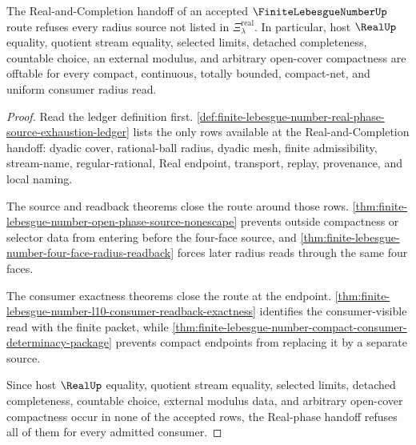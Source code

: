 \begin{theorem}
\label{thm:finite-lebesgue-number-real-phase-offtable-refusal}
The Real-and-Completion handoff of an accepted $\FiniteLebesgueNumberUp$ route refuses every radius source not listed in $\Xi_{\lambda}^{\mathrm{real}}$. In particular, host $\RealUp$ equality, quotient stream equality, selected limits, detached completeness, countable choice, an external modulus, and arbitrary open-cover compactness are offtable for every compact, continuous, totally bounded, compact-net, and uniform consumer radius read.
\end{theorem}
\begin{proof}
Read the ledger definition first. \autoref{def:finite-lebesgue-number-real-phase-source-exhaustion-ledger} lists the only rows available at the Real-and-Completion handoff: dyadic cover, rational-ball radius, dyadic mesh, finite admissibility, stream-name, regular-rational, Real endpoint, transport, replay, provenance, and local naming.

The source and readback theorems close the route around those rows. \autoref{thm:finite-lebesgue-number-open-phase-source-nonescape} prevents outside compactness or selector data from entering before the four-face source, and \autoref{thm:finite-lebesgue-number-four-face-radius-readback} forces later radius reads through the same four faces.

The consumer exactness theorems close the route at the endpoint. \autoref{thm:finite-lebesgue-number-l10-consumer-readback-exactness} identifies the consumer-visible read with the finite packet, while \autoref{thm:finite-lebesgue-number-compact-consumer-determinacy-package} prevents compact endpoints from replacing it by a separate source.

Since host $\RealUp$ equality, quotient stream equality, selected limits, detached completeness, countable choice, external modulus data, and arbitrary open-cover compactness occur in none of the accepted rows, the Real-phase handoff refuses all of them for every admitted consumer.
\end{proof}
